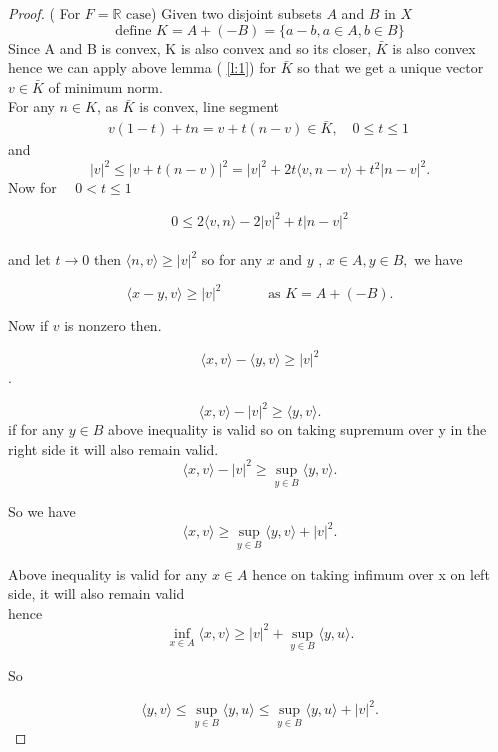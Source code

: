 \documentclass[oneside]{book}
\begin{document}
	
	
	
	
	\begin{proof}( For $ F=\mathbb{R} \text{ case}$)
		Given two disjoint subsets $A$ and $B$ in $X$
		\\
		$$ \text{define }K = A +(-B) = \{ a - b ,a \in A,b \in B\} $$
		Since A and B is convex,  K is also convex and so its closer, $ \bar{K}$ is also convex hence we can apply above lemma ( \ref{l:1}) for $\bar{K}$ so that we get a unique vector $v \in \bar{K}$ of minimum norm. \\
		For any $ n \in K$, as $\bar{K}$ is convex, line segment 
		$$\begin{aligned} v(1-t)+t n=v+t(n-v) \in \bar{K}  , \quad 0 \leq t \leq 1 
		\end{aligned}\ 
		$$    
		and
		$$ |v|^{2} \leq|v+t(n-v)|^{2}=|v|^{2}+2 t\langle v, n-v\rangle +t^{2}|n-v|^{2}.$$
		Now for $ \quad 0 < t \leq 1$    
		
		$$ 0 \leq 2\langle v, n\rangle-2|v|^{2}+t|n-v|^{2}$$
		\\
		and let $t \rightarrow 0$
		then
		$\langle n, v\rangle \geq|v|^{2}$
		so for any $x$ and $y$ , $ x \in A, y \in B,$
		we have 
		
		$$\langle x-y,v \rangle \geq |v|^{2}
		\quad \quad \quad \text{ as } K = A + (-B).$$
		
		Now if $v$ is nonzero then. 
		
		$$\langle x, v\rangle-\langle y, v\rangle \geqslant|v|^{2}$$.
		
		$$\langle x, v\rangle-|v|^{2} \geqslant\langle y, v\rangle.$$
		if for any $y \in B $
		above inequality is valid so on taking supremum over y in the right side it will  also remain valid.
		$$\langle x, v\rangle-|v|^{2} \geqslant \sup_{y \in B}\langle y, v\rangle.$$
		
		So we have
		$$
		\langle x, v \rangle \geqslant\sup_{y\in B}\langle y, v\rangle+|v|^{2}.
		$$
		
		
		Above inequality  is valid for any $x \in A$  hence on taking infimum over x on left side, it will  also remain valid  \\
		hence
		\begin{equation}
		\label{eq4.1}
		\inf _{x \in A}\langle x, v \rangle \geqslant|v|^{2}+\sup _{y \in B}\langle y, u\rangle.
		\end{equation}
		
		
		So
		
		$$ \langle y, v\rangle  \leqslant \sup _{y \in B}\langle y, u\rangle \leqslant  \sup _{y \in B}\langle y, u\rangle + |v|^{2}. $$
		

\end{proof}
\end{document}

